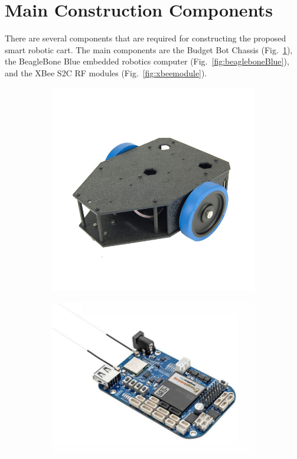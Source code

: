 \documentclass[conference]{IEEEtran}
\begin{document}
\section{Main Construction Components}
\label{sec:mainConstructionComponents}

There are several components that are required for constructing the proposed
smart robotic cart. The main components are the Budget Bot Chassis
(Fig.~\ref{fig:budgetBotChassis}), the BeagleBone Blue embedded robotics
computer (Fig.~\ref{fig:beagleboneBlue}), and the XBee S2C RF modules
(Fig.~\ref{fig:xbeemodule}). %
%
\begin{figure}[htbp]
  \centering
  \begin{subfigure}[b]{0.3\linewidth}
    \includegraphics[width=1\textwidth]{figs/img/budgetbot_chassis}
    \caption{}
    \label{fig:budgetBotChassis}
  \end{subfigure}
  \begin{subfigure}[b]{0.3\linewidth}
    \includegraphics[width=1\textwidth]{figs/img/beaglebone_blue}

\end{subfigure}
\end{figure}
\end{document}
